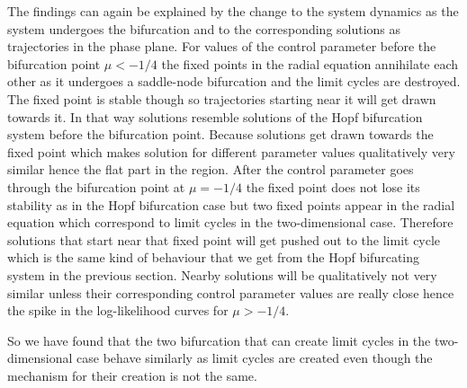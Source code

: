 The findings can again be explained by the change to the system dynamics as the system undergoes the bifurcation and to the corresponding solutions as trajectories in the phase plane. For values of the control parameter before the bifurcation point $\mu < -1/4$ the fixed points in the radial equation annihilate each other as it undergoes a saddle-node bifurcation and the limit cycles are destroyed. The fixed point is stable though so trajectories starting near it will get drawn towards it. In that way solutions resemble solutions of the Hopf bifurcation system before the bifurcation point. Because solutions get drawn towards the fixed point which makes solution for different parameter values qualitatively very similar hence the flat part in the region. After the control parameter goes through the bifurcation point at $\mu=-1/4$ the fixed point does not lose its stability as in the Hopf bifurcation case but two fixed points appear in the radial equation which correspond to limit cycles in the two-dimensional case. Therefore solutions that start near that fixed point will get pushed out to the limit cycle which is the same kind of behaviour that we get from the Hopf bifurcating system in the previous section. Nearby solutions will be qualitatively not very similar unless their corresponding control parameter values are really close hence the spike in the log-likelihood curves for $\mu > -1/4$.

So we have found that the two bifurcation that can create limit cycles in the two-dimensional case behave similarly as limit cycles are created even though the mechanism for their creation is not the same. 

%


